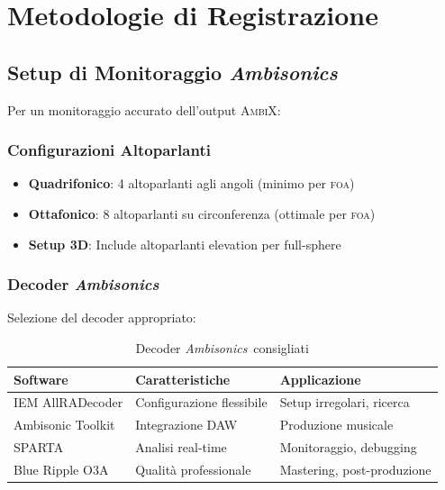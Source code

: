 \documentclass[a4paper,11pt,openany]{book}
\newcommand{\ambisonics}{\textit{Ambisonics}}
\newcommand{\foa}{\textsc{foa}}
\newcommand{\ambix}{\textsc{AmbiX}}
\begin{document}
\section{Metodologie di Registrazione}

\subsection{Setup di Monitoraggio \ambisonics}

Per un monitoraggio accurato dell'output \ambix:

\subsubsection{Configurazioni Altoparlanti}

\begin{itemize}
    \item \textbf{Quadrifonico}: 4 altoparlanti agli angoli (minimo per \foa)
    \item \textbf{Ottafonico}: 8 altoparlanti su circonferenza (ottimale per \foa)
    \item \textbf{Setup 3D}: Include altoparlanti elevation per full-sphere
\end{itemize}

\subsubsection{Decoder \ambisonics}

Selezione del decoder appropriato:

\begin{table}[H]
    \centering
    \caption{Decoder \ambisonics\ consigliati}
    \label{tab:ambisonic_decoders}
    \begin{tabular}{@{}lp{4cm}p{5cm}@{}}
        \toprule
        \textbf{Software} & \textbf{Caratteristiche} & \textbf{Applicazione} \\
        \midrule
        IEM AllRADecoder & Configurazione flessibile & Setup irregolari, ricerca \\
        Ambisonic Toolkit & Integrazione DAW & Produzione musicale \\
        SPARTA & Analisi real-time & Monitoraggio, debugging \\
        Blue Ripple O3A & Qualità professionale & Mastering, post-produzione \\
        \bottomrule
    \end{tabular}
\end{table}
\end{document}
